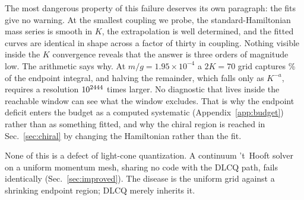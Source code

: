 The most dangerous property of this failure deserves its own paragraph:
the fits give no warning.  At the smallest coupling we probe, the
standard-Hamiltonian mass series is smooth in $K$, the extrapolation is
well determined, and the fitted curves are identical in shape across a
factor of thirty in coupling.  Nothing visible inside the $K$ convergence
reveals that the answer is three orders of magnitude low.  The arithmetic
says why.  At $m/g = 1.95\times10^{-4}$ a $2K = 70$ grid captures
\numCapturePctTiny\% of the endpoint integral, and halving the remainder,
which falls only as $K^{-a}$, requires a resolution
$10^{2444}$ times larger.  No diagnostic that lives inside
the reachable window can see what the window excludes.  That is why the
endpoint deficit enters the budget as a computed systematic
(Appendix~\ref{app:budget}) rather than as something fitted, and why the
chiral region is reached in Sec.~\ref{sec:chiral} by changing the
Hamiltonian rather than the fit.

None of this is a defect of light-cone quantization.  A continuum
't~Hooft solver on a uniform momentum mesh, sharing no code with the DLCQ
path, fails identically (Sec.~\ref{sec:improved}).  The disease is the
uniform grid against a shrinking endpoint region; DLCQ merely inherits it.
